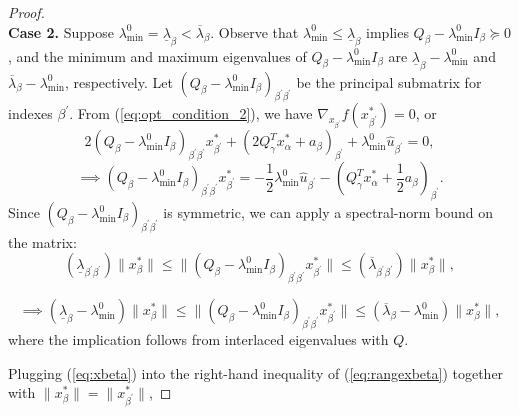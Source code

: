 \documentclass[]{article}
\begin{document}
\begin{proof}
        ~\\
        \textbf{Case 2.} Suppose $\lambda_{\min}^0 = \underline{\lambda}_\beta <\overline{\lambda}_\beta$. Observe that $\lambda_{\min}^0 \leq \underline{\lambda}_\beta$ implies $Q_\beta- \lambda_{\min}^0I_\beta \succeq 0$, and the minimum and maximum eigenvalues of $Q_\beta-\lambda_{\min}^0I_\beta $ are $\underline{\lambda}_\beta -\lambda_{\min}^0$ and $\overline{\lambda}_\beta -\lambda_{\min}^0$, respectively. Let $(Q_\beta-\lambda_{\min}^0I_{\beta})_{\beta^\prime\beta^\prime}$ be the principal submatrix for indexes $\beta^\prime$. From (\ref{eq:opt_condition_2}), we have $\nabla_{x_{\beta^\prime}}f(x^*_{\beta^\prime}) = 0$, or
        \[2(Q_{\beta}- \lambda_{\min}^0I_{\beta})_{\beta^\prime\beta^\prime}x_{\beta^\prime}^* + (2Q_\gamma^T x_\alpha^* + a_\beta)_{\beta^\prime}+\lambda_{\min}^0\hat{u}_{\beta^\prime} = 0,\]
        \begin{equation}\label{eq:xbeta}
            \implies (Q_{\beta}- \lambda_{\min}^0I_{\beta})_{\beta^\prime\beta^\prime}x_{\beta^\prime}^* =  -\frac{1}{2}\lambda_{\min}^0\hat{u}_{\beta^\prime}-(Q_\gamma^T x_\alpha^* + \frac{1}{2}a_{\beta})_{\beta^\prime}.
        \end{equation}
        Since $(Q_\beta-\lambda_{\min}^0I_\beta)_{\beta^\prime\beta^\prime}$ is symmetric, we can apply a spectral-norm bound on the matrix:
        \begin{equation*}
            (\underline{\lambda}_{\beta^\prime\beta^\prime})\|x_\beta^*\|\leq \|(Q_\beta-\lambda_{\min}^0I_\beta)_{\beta^\prime\beta^\prime}x_{\beta^\prime}^*\|\leq (\overline{\lambda}_{\beta^\prime\beta^\prime})\|x_\beta^*\|,
        \end{equation*}
      
        \begin{equation}\label{eq:rangexbeta}
            \implies (\underline{\lambda}_\beta -\lambda_{\min}^0)\|x_\beta^*\|\leq \|(Q_\beta-\lambda_{\min}^0I_\beta)_{\beta^\prime\beta^\prime}x_{\beta^\prime}^*\|\leq (\overline{\lambda}_\beta -\lambda_{\min}^0)\|x_\beta^*\|,
        \end{equation}
        where the implication follows from interlaced eigenvalues with $Q$.
        
        Plugging (\ref{eq:xbeta}) into the right-hand inequality of (\ref{eq:rangexbeta}) together with $\|x_\beta^*\| = \|x_{\beta^\prime}^*\|$,
        

\end{proof}
\end{document}
